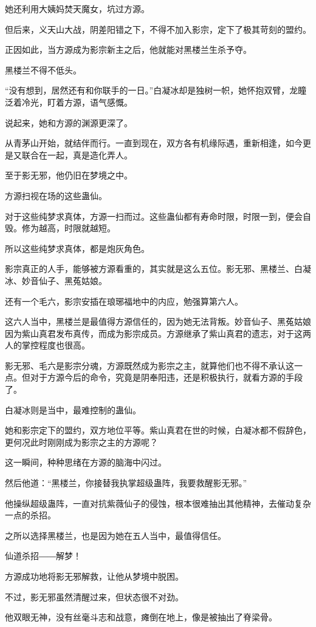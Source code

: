 \begin{this_body}
她还利用大姨妈焚天魔女，坑过方源。

但后来，义天山大战，阴差阳错之下，不得不加入影宗，定下了极其苛刻的盟约。

正因如此，当方源成为影宗新主之后，他就能对黑楼兰生杀予夺。

黑楼兰不得不低头。

“没有想到，居然还有和你联手的一日。”白凝冰却是独树一帜，她怀抱双臂，龙瞳泛着冷光，盯着方源，语气感慨。

说起来，她和方源的渊源更深了。

从青茅山开始，就结伴而行。一直到现在，双方各有机缘际遇，重新相逢，如今更是又联合在一起，真是造化弄人。

至于影无邪，他仍旧在梦境之中。

方源扫视在场的这些蛊仙。

对于这些纯梦求真体，方源一扫而过。这些蛊仙都有寿命时限，时限一到，便会自毁。修为越高，时限就越短。

所以这些纯梦求真体，都是炮灰角色。

影宗真正的人手，能够被方源看重的，其实就是这么五位。影无邪、黑楼兰、白凝冰、妙音仙子、黑菟姑娘。

还有一个毛六，影宗安插在琅琊福地中的内应，勉强算第六人。

这六人当中，黑楼兰是最值得方源信任的，因为她无法背叛。妙音仙子、黑菟姑娘因为紫山真君发布真传，而成为影宗成员。方源继承了紫山真君的遗志，对于这两人的掌控程度也很高。

影无邪、毛六是影宗分魂，方源既然成为影宗之主，就算他们也不得不承认这一点。但对于方源今后的命令，究竟是阴奉阳违，还是积极执行，就看方源的手段了。

白凝冰则是当中，最难控制的蛊仙。

她和影宗定下的盟约，双方地位平等。紫山真君在世的时候，白凝冰都不假辞色，更何况此时刚刚成为影宗之主的方源呢？

这一瞬间，种种思绪在方源的脑海中闪过。

然后他道：“黑楼兰，你接替我执掌超级蛊阵，我要救醒影无邪。”

他操纵超级蛊阵，一直对抗紫薇仙子的侵蚀，根本很难抽出其他精神，去催动复杂一点的杀招。

之所以选择黑楼兰，也是因为她在五人当中，最值得信任。

仙道杀招――解梦！

方源成功地将影无邪解救，让他从梦境中脱困。

不过，影无邪虽然清醒过来，但状态很不对劲。

他双眼无神，没有丝毫斗志和战意，瘫倒在地上，像是被抽出了脊梁骨。


\end{this_body}

